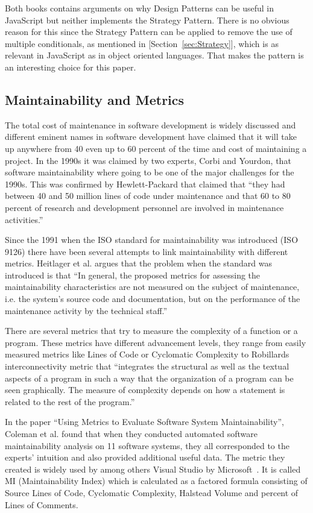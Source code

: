 \documentclass[conference, a4paper]{IEEEtran}
\begin{document}
Both books contains arguments on why Design Patterns can be useful in JavaScript but neither implements the Strategy Pattern. There is no obvious reason for this since the Strategy Pattern can be applied to remove the use of multiple conditionals, as mentioned in [Section~\ref{sec:Strategy}], which is as relevant in JavaScript as in object oriented languages. That makes the pattern is an interesting choice for this paper.

\subsection{Maintainability and Metrics}
\label{sec:Maintainability}
The total cost of maintenance in software development is widely discussed and different eminent names in software development have claimed that it will take up anywhere from 40 even up to 60 percent of the time and cost of maintaining a project. In the 1990s it was claimed by two experts, Corbi and Yourdon, that software maintainability where going to be one of the major challenges for the 1990s. This was confirmed by Hewlett-Packard that claimed that ``they had between 40 and 50 million lines of code under maintenance and that 60 to 80 percent of research and development personnel are involved in maintenance activities.''~\cite{bibitem:MetricsToEvaluate}

Since the 1991 when the ISO standard for maintainability was introduced (ISO 9126) there have been several attempts to link maintainability with different metrics. Heitlager et al. argues that the problem when the standard was introduced is that ``In general, the proposed metrics for assessing the maintainability characteristics are not measured on the subject of maintenance, i.e. the system’s source code and documentation, but on the performance of the maintenance activity by the technical staff.''~\cite{bibitem:Maintainability}

There are several metrics that try to measure the complexity of a function or a program. These metrics have different advancement levels, they range from easily measured metrics like Lines of Code or Cyclomatic Complexity to Robillards interconnectivity metric that ``integrates the structural as well as the textual aspects of a program in such a way that the organization of a program can be seen graphically. The measure of complexity depends on how a statement is related to the rest of the program.''~\cite{bibitem:Robillard}

In the paper ``Using Metrics to Evaluate Software System Maintainability'', Coleman et al. found that when they conducted automated software maintainability analysis on 11 software systems, they all corresponded to the experts' intuition and also provided additional useful data. The metric they created is widely used by among others Visual Studio by Microsoft~\cite{bibitem:MI}. It is called MI (Maintainability Index) which is calculated as a factored formula consisting of Source Lines of Code, Cyclomatic Complexity, Halstead Volume and percent of Lines of Comments.~\cite{bibitem:MetricsToEvaluate}
\end{document}
